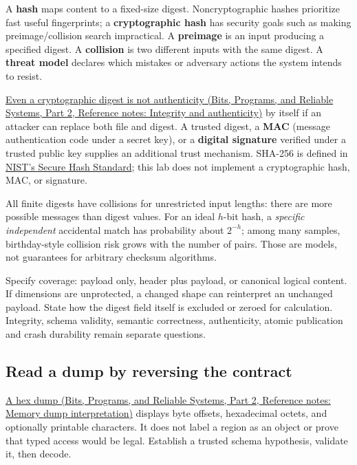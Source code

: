 A \textbf{hash} maps content to a fixed-size digest. Noncryptographic hashes prioritize fast useful fingerprints; a \textbf{cryptographic hash} has security goals such as making preimage/collision search impractical. A \textbf{preimage} is an input producing a specified digest. A \textbf{collision} is two different inputs with the same digest. A \textbf{threat model} declares which mistakes or adversary actions the system intends to resist.

\href{../01-Bits-Programs-and-Reliable-Systems-P02/main.pdf\#appendix-cbe594d1ab0a}{Even a cryptographic digest is not authenticity (Bits, Programs, and Reliable Systems, Part 2, Reference notes: Integrity and authenticity)} by itself if an attacker can replace both file and digest. A trusted digest, a \textbf{MAC} (message authentication code under a secret key), or a \textbf{digital signature} verified under a trusted public key supplies an additional trust mechanism. SHA-256 is defined in \href{https://csrc.nist.gov/pubs/fips/180-4/upd1/final}{NIST's Secure Hash Standard}; this lab does not implement a cryptographic hash, MAC, or signature.

All finite digests have collisions for unrestricted input lengths: there are more possible messages than digest values. For an ideal \(h\)-bit hash, a \emph{specific independent} accidental match has probability about \(2^{-h}\); among many samples, birthday-style collision risk grows with the number of pairs. Those are models, not guarantees for arbitrary checksum algorithms.

Specify coverage: payload only, header plus payload, or canonical logical content. If dimensions are unprotected, a changed shape can reinterpret an unchanged payload. State how the digest field itself is excluded or zeroed for calculation. Integrity, schema validity, semantic correctness, authenticity, atomic publication and crash durability remain separate questions.

\subsection{Read a dump by reversing the contract}\label{05-engine-i-ch002-read-a-dump-by-reversing-the-contract}

\hypertarget{05-engine-i-ch002-read-a-dump-by-reversing-the-contract}{}

\href{../01-Bits-Programs-and-Reliable-Systems-P02/main.pdf\#appendix-230b59c0676b}{A hex dump (Bits, Programs, and Reliable Systems, Part 2, Reference notes: Memory dump interpretation)} displays byte offsets, hexadecimal octets, and optionally printable characters. It does not label a region as an object or prove that typed access would be legal. Establish a trusted schema hypothesis, validate it, then decode.

